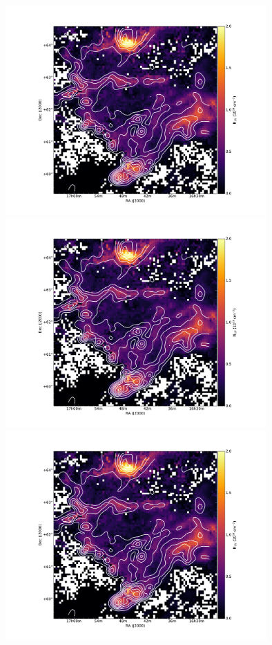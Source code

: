 \documentclass[traditabstract]{aa}
\begin{document}
\begin{figure}[h]
  \centering
  \includegraphics[page=1,height=8cm,trim=110 35 130 75,clip=true]{Figures/GHIGLS_NHI.pdf}
  \hspace{3mm}
  \includegraphics[page=4,height=8cm,trim=110 35 130 75,clip=true]{Figures/GHIGLS_NHI.pdf} \\
  \vspace{3mm}
  \includegraphics[page=2,height=8cm,trim=110 35 130 75,clip=true]{Figures/GHIGLS_NHI.pdf}

\end{figure}
\end{document}
